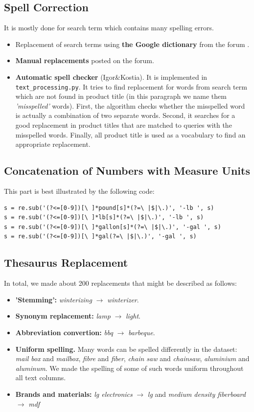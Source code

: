 \documentclass[12pt]{article}
\begin{document}
\subsection{Spell Correction}
It is mostly done for search term which contains many spelling errors.
\begin{itemize}
\item Replacement of search terms using \textbf{the Google dictionary} from the forum  \cite{Google_dict}.
\item \textbf{Manual replacements} posted on the forum.
\item \textbf{Automatic spell checker} (Igor\&Kostia). It is implemented in \texttt{text\_processing.py}. It tries to find replacement for words from search term which are not found in product title (in this paragraph we name them \emph{'misspelled'} words). First, the algorithm checks whether the misspelled word is actually a combination of two separate words. Second, it searches for a good replacement in product titles that are matched to queries with the misspelled words. Finally, all product title is used as a vocabulary to find an appropriate replacement.
\end{itemize}


\subsection{Concatenation of Numbers with Measure Units}
This part is best illustrated by the following code:

\begin{verbatim}
s = re.sub('(?<=[0-9])[\ ]*pound[s]*(?=\ |$|\.)', '-lb ', s)
s = re.sub('(?<=[0-9])[\ ]*lb[s]*(?=\ |$|\.)', '-lb ', s)
s = re.sub('(?<=[0-9])[\ ]*gallon[s]*(?=\ |$|\.)', '-gal ', s)
s = re.sub('(?<=[0-9])[\ ]*gal(?=\ |$|\.)', '-gal ', s)
\end{verbatim}


\subsection{Thesaurus Replacement}
In total, we made about 200 replacements that might be described as follows:

\begin{itemize}
\item \textbf{'Stemming':} \emph{winterizing}	$\rightarrow$ \emph{winterizer}.
\item \textbf{Synonym replacement:} \emph{lamp}	$\rightarrow$ \emph{light}.
\item \textbf{Abbreviation convertion:} \emph{bbq}	$\rightarrow$ \emph{barbeque}.
\item \textbf{Uniform spelling.} Many words can be spelled differently in the dataset: \emph{mail box} and \emph{mailbox}, \emph{fibre} and \emph{fiber}, \emph{chain saw} and \emph{chainsaw}, \emph{aluminium} and \emph{aluminum}. We made the spelling of some of such words uniform throughout all text columns.
\item \textbf{Brands and materials:} \emph{lg electronics} $\rightarrow$    \emph{lg} and  \emph{medium density fiberboard}  $\rightarrow$  \emph{mdf}
\end{itemize}
\end{document}
